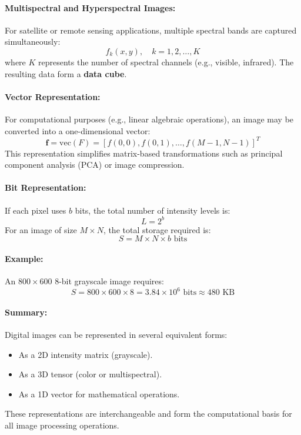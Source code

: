 \documentclass[12pt,a4paper]{AnantDocumentation}
\begin{document}
\paragraph{Multispectral and Hyperspectral Images:}
For satellite or remote sensing applications, multiple spectral bands are captured simultaneously:
\begin{equation}
f_k(x, y), \quad k = 1, 2, \dots, K
\end{equation}
where $K$ represents the number of spectral channels (e.g., visible, infrared). The resulting data form a \textbf{data cube}.

\paragraph{Vector Representation:}
For computational purposes (e.g., linear algebraic operations), an image may be converted into a one-dimensional vector:
\begin{equation}
\mathbf{f} = \text{vec}(F) = [f(0,0), f(0,1), \dots, f(M-1,N-1)]^T
\end{equation}
This representation simplifies matrix-based transformations such as principal component analysis (PCA) or image compression.

\paragraph{Bit Representation:}
If each pixel uses $b$ bits, the total number of intensity levels is:
\begin{equation}
L = 2^b
\end{equation}
For an image of size $M \times N$, the total storage required is:
\begin{equation}
S = M \times N \times b \text{ bits}
\end{equation}

\paragraph{Example:}
An $800 \times 600$ 8-bit grayscale image requires:
\[
S = 800 \times 600 \times 8 = 3.84 \times 10^6 \text{ bits} \approx 480 \text{ KB}
\]

\paragraph{Summary:}
Digital images can be represented in several equivalent forms:
\begin{itemize}
\item As a 2D intensity matrix (grayscale).
\item As a 3D tensor (color or multispectral).
\item As a 1D vector for mathematical operations.
\end{itemize}
These representations are interchangeable and form the computational basis for all image processing operations.
\end{document}
